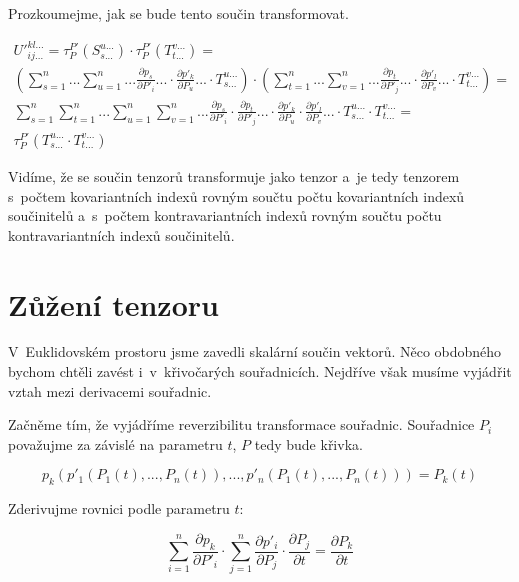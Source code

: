 Prozkoumejme, jak se bude tento součin transformovat.

\begin{equation}
\begin{split}
U'^{kl...}_{ij...} = \tau_{P}^{P'}(S_{s...}^{u...}) \cdot \tau_{P}^{P'}(T_{t...}^{v...}) = \\
\left( \sum_{s=1}^n ... \sum_{u=1}^n ... \frac{\partial p_s}{\partial P'_i} ... \cdot \frac{\partial p'_k}{\partial P_u} ... \cdot T_{s...}^{u...} \right) \cdot \left( \sum_{t=1}^n ... \sum_{v=1}^n ... \frac{\partial p_t}{\partial P'_j} ... \cdot \frac{\partial p'_l}{\partial P_v} ... \cdot T_{t...}^{v...} \right) = \\
\sum_{s=1}^n \sum_{t=1}^n ... \sum_{u=1}^n \sum_{v=1}^n ... \frac{\partial p_s}{\partial P'_i} \cdot \frac{\partial p_t}{\partial P'_j} ... \cdot \frac{\partial p'_k}{\partial P_u} \cdot \frac{\partial p'_l}{\partial P_v} ... \cdot T_{s...}^{u...} \cdot T_{t...}^{v...} = \\
\tau_{P}^{P'}(T_{s...}^{u...} \cdot T_{t...}^{v...})
\end{split}
\end{equation}

Vidíme, že se součin tenzorů transformuje jako tenzor a~je tedy tenzorem s~počtem kovariantních indexů rovným součtu počtu kovariantních indexů součinitelů a~s~počtem kontravariantních indexů rovným součtu počtu kontravariantních indexů součinitelů. 

\section{Zůžení tenzoru}

V~Euklidovském prostoru jsme zavedli skalární součin vektorů. Něco obdobného bychom chtěli zavést i~v~křivočarých souřadnicích. Nejdříve však musíme vyjádřit vztah mezi derivacemi souřadnic.

Začněme tím, že vyjádříme reverzibilitu transformace souřadnic. Souřadnice \(P_i\) považujme za závislé na parametru \(t\), \(P\) tedy bude křivka.

\begin{equation}
p_k(p'_1(P_1(t), ..., P_n(t)), ..., p'_n(P_1(t), ..., P_n(t))) = P_k(t)
\end{equation}

Zderivujme rovnici podle parametru \(t\):

\begin{equation}
\label{eq:reverzibilni_derivace}
\sum_{i=1}^n \frac{\partial p_k}{\partial P'_i} \cdot \sum_{j=1}^n \frac{\partial p'_i}{\partial P_j} \cdot \frac{\partial P_j}{\partial t} = \frac{\partial P_k}{\partial t}
\end{equation}

